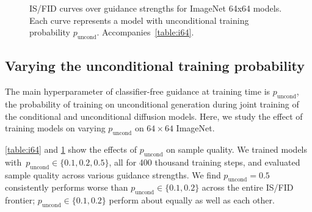 \documentclass{article} %
\begin{document}
\loadedtable
\begin{figure}[!htb] \centering
{}
\caption{IS/FID curves over guidance strengths for ImageNet 64x64 models. Each curve represents a model with unconditional training probability $p_\mathrm{uncond}$. Accompanies~\cref{table:i64}.}
\label{fig:i64_fid_is_plot}
\end{figure}


\subsection{Varying the unconditional training probability}

The main hyperparameter of classifier-free guidance at training time is $p_\mathrm{uncond}$, the probability of training on unconditional generation during joint training of the conditional and unconditional diffusion models. Here, we study the effect of training models on varying $p_\mathrm{uncond}$ on $64\times64$ ImageNet.

\cref{table:i64} and \cref{fig:i64_fid_is_plot} show the effects of $p_\mathrm{uncond}$ on sample quality. We trained models with~$p_\mathrm{uncond}\in\{0.1,0.2,0.5\}$, all for 400 thousand training steps, and evaluated sample quality across various guidance strengths. We find $p_\mathrm{uncond}=0.5$ consistently performs worse than $p_\mathrm{uncond}\in\{0.1,0.2\}$ across the entire IS/FID frontier; $p_\mathrm{uncond}\in\{0.1,0.2\}$ perform about equally as well as each other.
\end{document}
